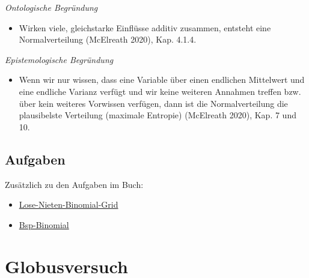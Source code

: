 \documentclass[
  a4paper,
  DIV=11]{scrreprt}
\providecommand{\tightlist}{%
  \setlength{\itemsep}{0pt}\setlength{\parskip}{0pt}}\usepackage{longtable,booktabs,array}
\theoremstyle{definition}
\theoremstyle{remark}
\begin{document}
\begin{tcolorbox}[enhanced jigsaw, colframe=quarto-callout-note-color-frame, title=\textcolor{quarto-callout-note-color}{\faInfo}\hspace{0.5em}{Hinweis}, breakable, leftrule=.75mm, coltitle=black, toptitle=1mm, bottomrule=.15mm, bottomtitle=1mm, opacityback=0, arc=.35mm, rightrule=.15mm, left=2mm, colbacktitle=quarto-callout-note-color!10!white, opacitybacktitle=0.6, toprule=.15mm, titlerule=0mm, colback=white]

\emph{Ontologische Begründung}

\begin{itemize}
\tightlist
\item
  Wirken viele, gleichstarke Einflüsse additiv zusammen, entsteht eine
  Normalverteilung (McElreath 2020), Kap. 4.1.4.
\end{itemize}

\emph{Epistemologische Begründung}

\begin{itemize}
\tightlist
\item
  Wenn wir nur wissen, dass eine Variable über einen endlichen
  Mittelwert und eine endliche Varianz verfügt und wir keine weiteren
  Annahmen treffen bzw. über kein weiteres Vorwissen verfügen, dann ist
  die Normalverteilung die plausibelste Verteilung (maximale Entropie)
  (McElreath 2020), Kap. 7 und 10.
\end{itemize}

\end{tcolorbox}

\hypertarget{aufgaben-2}{%
\section{Aufgaben}\label{aufgaben-2}}

Zusätzlich zu den Aufgaben im Buch:

\begin{itemize}
\tightlist
\item
  \href{https://datenwerk.netlify.app/posts/lose-nieten-binomial-grid/lose-nieten-binomial-grid}{Lose-Nieten-Binomial-Grid}
\item
  \href{https://datenwerk.netlify.app/posts/bsp-binomial/bsp-binomial}{Bsp-Binomial}
\end{itemize}


\hypertarget{globusversuch}{%
\chapter{Globusversuch}\label{globusversuch}}
\end{document}
